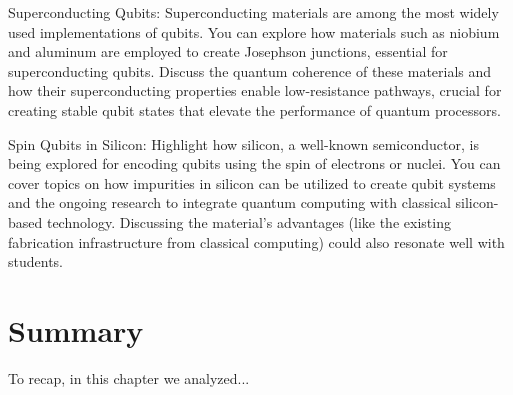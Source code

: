 \documentclass[12pt, english]{book}
\begin{document}
Superconducting Qubits: Superconducting materials are among the most widely used implementations of qubits. You can explore how materials such as niobium and aluminum are employed to create Josephson junctions, essential for superconducting qubits. Discuss the quantum coherence of these materials and how their superconducting properties enable low-resistance pathways, crucial for creating stable qubit states that elevate the performance of quantum processors.

Spin Qubits in Silicon: Highlight how silicon, a well-known semiconductor, is being explored for encoding qubits using the spin of electrons or nuclei. You can cover topics on how impurities in silicon can be utilized to create qubit systems and the ongoing research to integrate quantum computing with classical silicon-based technology. Discussing the material's advantages (like the existing fabrication infrastructure from classical computing) could also resonate well with students.



\section{Summary}
To recap, in this chapter we analyzed...

\end{document}
